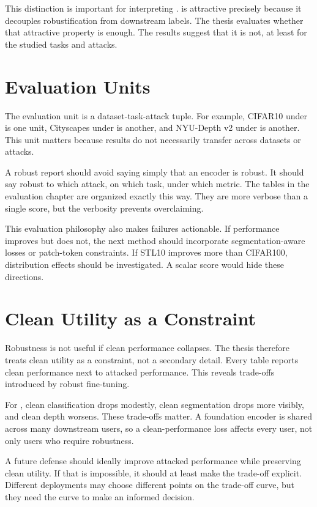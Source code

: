 This distinction is important for interpreting \DeACL. \DeACL is attractive precisely because it decouples robustification from downstream labels. The thesis evaluates whether that attractive property is enough. The results suggest that it is not, at least for the studied tasks and attacks.

\section{Evaluation Units}

The evaluation unit is a dataset-task-attack tuple. For example, CIFAR10 under \PGD is one unit, Cityscapes under \SegPGD is another, and NYU-Depth v2 under \DepthPGD is another. This unit matters because results do not necessarily transfer across datasets or attacks.

A robust report should avoid saying simply that an encoder is robust. It should say robust to which attack, on which task, under which metric. The tables in the evaluation chapter are organized exactly this way. They are more verbose than a single score, but the verbosity prevents overclaiming.

This evaluation philosophy also makes failures actionable. If \EmbedAttack performance improves but \SegPGD does not, the next method should incorporate segmentation-aware losses or patch-token constraints. If STL10 improves more than CIFAR100, distribution effects should be investigated. A scalar score would hide these directions.

\section{Clean Utility as a Constraint}

Robustness is not useful if clean performance collapses. The thesis therefore treats clean utility as a constraint, not a secondary detail. Every table reports clean performance next to attacked performance. This reveals trade-offs introduced by robust fine-tuning.

For \DeACL, clean classification drops modestly, clean segmentation drops more visibly, and clean depth worsens. These trade-offs matter. A foundation encoder is shared across many downstream users, so a clean-performance loss affects every user, not only users who require robustness.

A future defense should ideally improve attacked performance while preserving clean utility. If that is impossible, it should at least make the trade-off explicit. Different deployments may choose different points on the trade-off curve, but they need the curve to make an informed decision.

